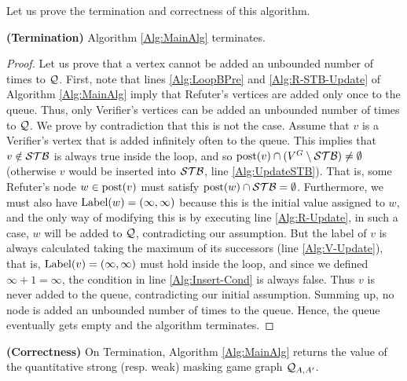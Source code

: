 	 Let us prove the termination and correctness of this algorithm.

\sloppy \begin{thm}\label{th:alg-termination}  \textbf{(Termination)} Algorithm \ref{Alg:MainAlg} terminates.
\end{thm}
\begin{proof}
	Let us prove that a vertex cannot be added an unbounded number of times to $\mathcal{Q}$. 
First, note that lines \ref{Alg:LoopBPre} and \ref{Alg:R-STB-Update} of Algorithm \ref{Alg:MainAlg} imply that Refuter's vertices are 
added only once to the queue. 
Thus, only Verifier's vertices can be added an unbounded number of times to $\mathcal{Q}$. 
We prove by contradiction that this is not the case. 
Assume that $v$ is a Verifier's vertex that is added infinitely often to the queue. 
This implies that $v \notin \mathcal{STB}$ is always true inside the loop, and so 
$\operatorname{post}(v) \cap (V^G \setminus \mathcal{STB}) \neq \emptyset$ (otherwise $v$ would be inserted into $\mathcal{STB}$, line \ref{Alg:UpdateSTB}). 
That is,  some Refuter's node  $w \in \operatorname{post}(v)$ must satisfy $\operatorname{post}(w) \cap \mathcal{STB} = \emptyset$. 
Furthermore, we must also have $\operatorname{Label}(w) = (\infty, \infty)$ because this is the initial value assigned to $w$, 
and the only way of modifying this is by executing line \ref{Alg:R-Update}, 
in such a case, $w$ will be added to $\mathcal{Q}$, contradicting our assumption. 
But the label of $v$ is always calculated taking the maximum of its successors (line \ref{Alg:V-Update}), that is, 
$\operatorname{Label}(v) = (\infty, \infty)$ must hold inside the loop, and since we defined $\infty + 1 = \infty$, the condition in line \ref{Alg:Insert-Cond} is always false.
Thus $v$ is never added to the queue, contradicting our initial assumption. 
Summing up, no node is added an unbounded number of times to the queue. Hence, 
the queue eventually gets empty and the algorithm terminates.
\qedhere
\end{proof} 
\sloppy \begin{thm}\label{th:alg-correctness} \textbf{(Correctness)} On Termination, Algorithm \ref{Alg:MainAlg} 
returns the value of the quantitative strong (resp. weak) masking game graph $\mathcal{Q}_{A, A'}$.
\end{thm}
